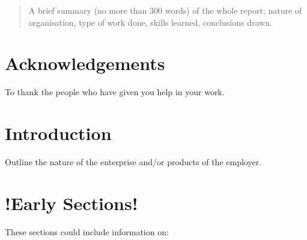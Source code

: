 \documentclass[pdftex, 12pt, a4paper, twoside]{article} %
\let\oldsection\section
\def\section{\cleardoublepage\oldsection}
\begin{document}


\thispagestyle{plain} %
\clearpage\mbox{}\clearpage 






\renewcommand{\abstractname}{Summary}
\begin{abstract}
A brief summary (no more than 300 words) of the whole report; nature of organisation, type of work done, skills learned, conclusions drawn.

\lipsum[1-2]
\end{abstract}

\section*{Acknowledgements}
To thank the people who have given you help in your work.

\lipsum[1-2]



\renewcommand{\contentsname}{Table of Contents}
\tableofcontents
\listoffigures
\listoftables\cleardoublepage


\setcounter{page}{1}


\section{Introduction}
\label{sec:introduction}
Outline the nature of the enterprise and/or products of the employer.
\lipsum[1-2]


\section{!Early Sections!}
\label{sec:earlysection}
These sections could include information on:
\end{document}
